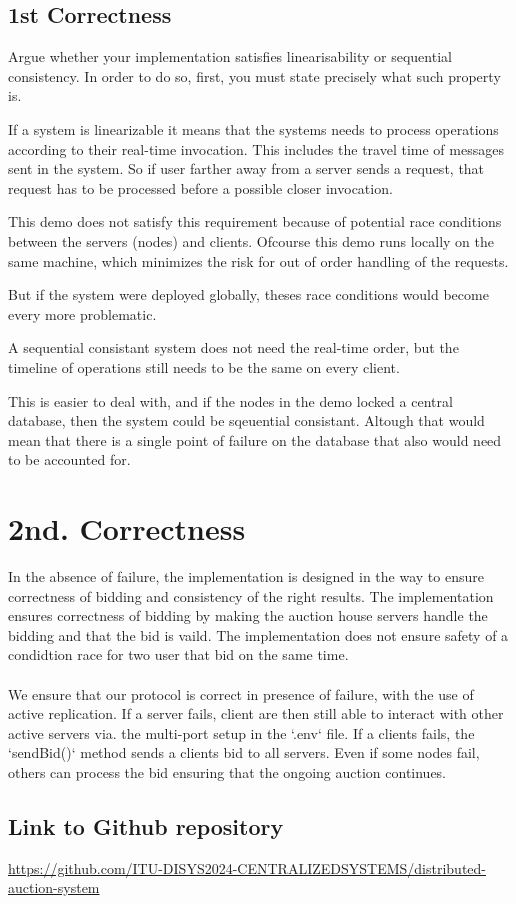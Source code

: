 \documentclass[a4paper,11pt]{article}
\begin{document}
\subsection{1st Correctness}
Argue whether your implementation satisfies linearisability or sequential consistency. In order to do so, first, you must state precisely what such property is.


If a system is linearizable it means that the systems needs to process operations according to their real-time invocation.
This includes the travel time of messages sent in the system. So if user farther away from a server sends a request,
that request has to be processed before a possible closer invocation.

This demo does not satisfy this requirement because of potential race conditions between the servers (nodes) and clients.
Ofcourse this demo runs locally on the same machine, which minimizes the risk for out of order handling of the requests.

But if the system were deployed globally, theses race conditions would become every more problematic.


A sequential consistant system does not need the real-time order, but the timeline of operations still needs to be the same on every client.

This is easier to deal with, and if the nodes in the demo locked a central database, then the system could be sqeuential consistant.
Altough that would mean that there is a single point of failure on the database that also would need to be accounted for.

\section{2nd. Correctness}
In the absence of failure, the implementation is designed in the way to ensure correctness of bidding and consistency of the right results. 
The implementation ensures correctness of bidding by making the auction house servers handle the bidding and that the bid is vaild. The implementation does not ensure safety of a condidtion race for two user that bid on the same time.
\\
\\
We ensure that our protocol is correct in presence of failure, with the use of active replication. 
If a server fails, client are then still able to interact with other active servers via. the multi-port setup in the `.env` file.
If a clients fails, the `sendBid()` method sends a clients bid to all servers. Even if some nodes fail, others can process the bid ensuring that the ongoing auction continues.
\\

\subsection*{Link to Github repository}

\href{https://github.com/ITU-DISYS2024-CENTRALIZEDSYSTEMS/distributed-auction-system}{https://github.com/ITU-DISYS2024-CENTRALIZEDSYSTEMS/distributed-auction-system}
\end{document}
